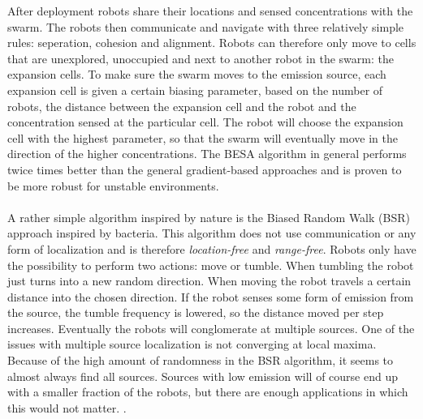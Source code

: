 		After deployment robots share their locations and sensed concentrations with the swarm.
		The robots then communicate and navigate with three relatively simple rules: seperation, cohesion and alignment.
		Robots can therefore only move to cells that are unexplored, unoccupied and next to another robot in the swarm: the expansion cells.
		To make sure the swarm moves to the emission source, each expansion cell is given a certain biasing parameter, based on the number of robots, the distance between the expansion cell and the robot and the concentration sensed at the particular cell.
		The robot will choose the expansion cell with the highest parameter, so that the swarm will eventually move in the direction of the higher concentrations.
		The BESA algorithm in general performs twice times better than the general gradient-based approaches and is proven to be more robust for unstable environments. \cite{cui2004swarm}
		\\ \\
		A rather simple algorithm inspired by nature is the Biased Random Walk (BSR) approach inspired by bacteria.
		This algorithm does not use communication or any form of localization and is therefore \emph{location-free} and \emph{range-free}.
		Robots only have the possibility to perform two actions: move or tumble. 
		When tumbling the robot just turns into a new random direction. 
		When moving the robot travels a certain distance into the chosen direction. 
		If the robot senses some form of emission from the source, the tumble frequency is lowered, so the distance moved per step increases.
		Eventually the robots will conglomerate at multiple sources.
		One of the issues with multiple source localization is not converging at local maxima.
		Because of the high amount of randomness in the BSR algorithm, it seems to almost always find all sources. Sources with low emission will of course end up with a smaller fraction of the robots, but there are enough applications in which this would not matter. \cite{dhariwal2004bacterium}.

